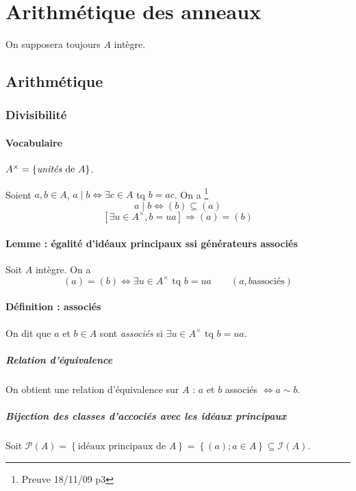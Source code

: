 \documentclass[reqno,a4paper,10pt]{report}
\makeatletter
\newcommand{\set}[1]{\left\lbrace #1 \right\rbrace} %
\newcommand{\soo}{\Longrightarrow}
\newcommand{\pfootnote}[1]{\up{(}\footnote{#1}\up{)}} %
\let\olditemize=\itemize%
\renewenvironment{itemize}{%
    \olditemize%
  }{%
    \@noparlisttrue%
    \endlist%
  }%
\makeatother
\begin{document}
\pagebreak
\part{Arithmétique des anneaux}
On supposera toujours $A$ intègre.

\chapter{Arithmétique}
\section{Divisibilité}
\subsection{Vocabulaire}
\begin{itemize}
  \item $A^\times = \set{\text{\emph{unités} de } A}$.
  \item Soient $a,b \in A$, $a \mid b \iff \exists c \in A$ tq $b=ac$. On a
      \pfootnote{Preuve 18/11/09 p3}
    \[a \mid b \iff (b) \subseteq (a)\]
    \[ [\exists u \in A^\times, b = ua] \soo (a) = (b)\]
\end{itemize}

\subsection{Lemme : égalité d'idéaux principaux ssi générateurs associés}
Soit $A$ intègre. On a
\[(a)=(b) \iff \exists u \in A^\times \text{ tq } b=ua \qquad(a,b \text{
associés})\]

\subsection{Définition : associés}
On dit que $a$ et $b \in A$ sont \emph{associés} si $\exists u \in A^\times$ tq
$b=ua$.

\subsubsection*{Relation d'équivalence} On obtient une relation
d'équivalence sur $A$ : $a$ et $b$ associés $\iff a \sim b$.

\subsubsection{Bijection des classes d'accociés avec les idéaux principaux}
Soit $\mathcal P (A) = \set{\text{idéaux principaux de }A}=\set{(a);a\in
A}\subseteq \mathcal I(A)$.
\end{document}
